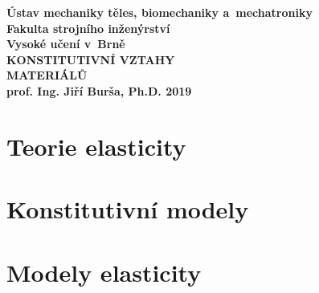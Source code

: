 \documentclass[a4paper, 10pt, oneside]{report}
\numberwithin{equation}{part}
\begin{document}
\begin{titlepage}
\pagecolor{fsimodra}
\color{white}
\renewcommand{\thepage}{Cover}
\centering
\bfseries
{Ústav mechaniky těles, biomechaniky a~mechatroniky\\Fakulta strojního inženýrství\\Vysoké učení v~Brně\\}
\vfill
{\Huge KONSTITUTIVNÍ VZTAHY\\MATERIÁLŮ\\}
\vfill
{\LARGE prof. Ing. Jiří Burša, Ph.D.}
\vfill
2019
\end{titlepage}

\clearpage
\nopagecolor
\color{black}
\tableofcontents

\clearpage
{}
\chapter{Teorie elasticity}


















%

\chapter{Konstitutivní modely}









\chapter{Modely elasticity}


















\end{document}
